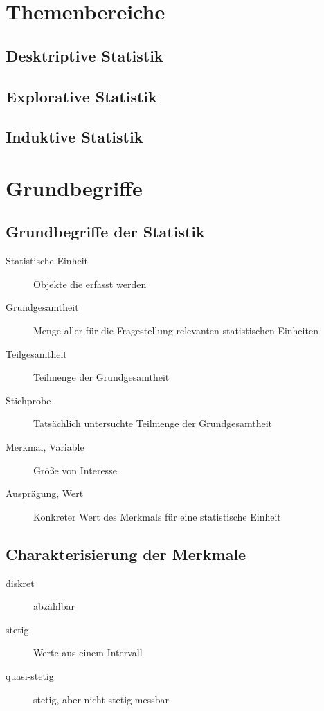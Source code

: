 \chapter{Themenbereiche}
\section{Desktriptive Statistik}

\section{Explorative Statistik}

\section{Induktive Statistik}





\chapter{Grundbegriffe}
\section{Grundbegriffe der Statistik}
\begin{description}
	\item[Statistische Einheit]
	Objekte die erfasst werden

	\item[Grundgesamtheit]
	Menge aller für die Fragestellung relevanten statistischen Einheiten

	\item[Teilgesamtheit]
	Teilmenge der Grundgesamtheit

	\item[Stichprobe]
	Tatsächlich untersuchte Teilmenge der Grundgesamtheit

	\item[Merkmal, Variable]
	Größe von Interesse

	\item[Ausprägung, Wert]
	Konkreter Wert des Merkmals für eine statistische Einheit
\end{description}
\section{Charakterisierung der Merkmale}
\begin{description}
	\item[diskret]
	abzählbar
	\item[stetig]
	Werte aus einem Intervall
	\item[quasi-stetig]
	stetig, aber nicht stetig messbar
\end{description}
